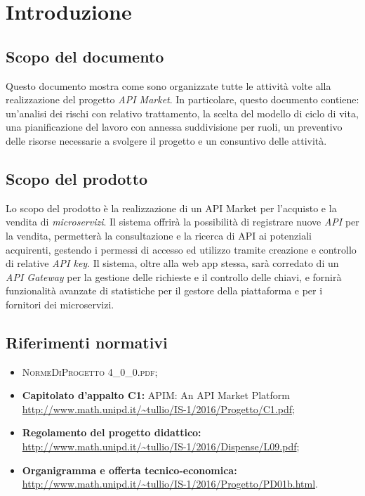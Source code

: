 \newpage
\section{Introduzione}

\subsection{Scopo del documento}
Questo documento mostra come sono organizzate tutte le attività volte alla realizzazione del progetto \textit{API Market}. In particolare, questo documento contiene: un'analisi dei rischi con relativo trattamento, la scelta del modello di ciclo di vita, una pianificazione del lavoro con annessa suddivisione per ruoli, un preventivo delle risorse necessarie a svolgere il progetto e un consuntivo delle attività.

\subsection{Scopo del prodotto}
Lo scopo del prodotto è la realizzazione di un API Market per l'acquisto e la vendita di \textit{microservizi}. Il sistema offrirà la possibilità di registrare nuove \textit{API} per la vendita, permetterà la consultazione e la ricerca di API ai potenziali acquirenti, gestendo i permessi di accesso ed utilizzo tramite creazione e controllo di relative \textit{API key}. Il sistema, oltre alla web app stessa, sarà corredato di un \textit{API Gateway} per la gestione delle richieste e il controllo delle chiavi, e fornirà funzionalità avanzate di statistiche per il gestore della piattaforma e per i fornitori dei microservizi.

\subsection{Riferimenti normativi}
	\begin{itemize}
		\item \textsc{NormeDiProgetto 4\_0\_0.pdf};
		\item \textbf{Capitolato d’appalto C1:} APIM: An API Market Platform\\ \url{http://www.math.unipd.it/~tullio/IS-1/2016/Progetto/C1.pdf};
		\item \textbf{Regolamento del progetto didattico:}\\
		\url{http://www.math.unipd.it/~tullio/IS-1/2016/Dispense/L09.pdf};
		\item \textbf{Organigramma e offerta tecnico-economica:}\\
		\url{http://www.math.unipd.it/~tullio/IS-1/2016/Progetto/PD01b.html}.
	\end{itemize}

